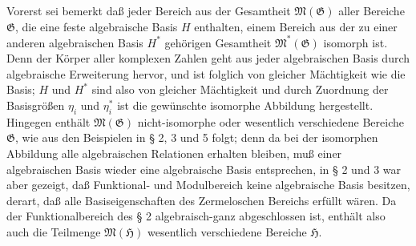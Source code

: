 Vorerst sei bemerkt daß jeder Bereich aus der Gesamtheit
$\mathfrak M(\mathfrak G)$ aller Bereiche $\mathfrak G$, die eine feste
algebraische Basis $H$ enthalten, einem Bereich aus der zu einer anderen
algebraischen Basis $H^*$ gehörigen Gesamtheit $\mathfrak M^*(\mathfrak G)$
isomorph ist. Denn der Körper aller komplexen Zahlen geht aus jeder algebraischen
Basis durch algebraische Erweiterung hervor, und ist folglich von gleicher
Mächtigkeit wie die Basis; $H$ und $H^*$ sind
also von gleicher Mächtigkeit und durch Zuordnung der Basisgrößen $\eta_i$ und
$\eta_i^*$ ist die gewünschte isomorphe Abbildung hergestellt. Hingegen enthält
$\mathfrak M(\mathfrak G)$ nicht-isomorphe oder wesentlich verschiedene Bereiche
$\mathfrak G$, wie aus den Beispielen in § 2, 3 und 5 folgt; denn da bei der
isomorphen Abbildung alle algebraischen Relationen erhalten bleiben, muß einer
algebraischen Basis wieder eine algebraische Basis entsprechen, in § 2 und 3 war
aber gezeigt, daß Funktional- und Modulbereich keine algebraische Basis besitzen,
derart, daß alle Basiseigenschaften des Zermeloschen Bereichs erfüllt wären. Da
der Funktionalbereich des § 2 algebraisch-ganz abgeschlossen ist, enthält also
auch die Teilmenge $\mathfrak M(\mathfrak H)$ wesentlich verschiedene Bereiche
$\mathfrak H$.

